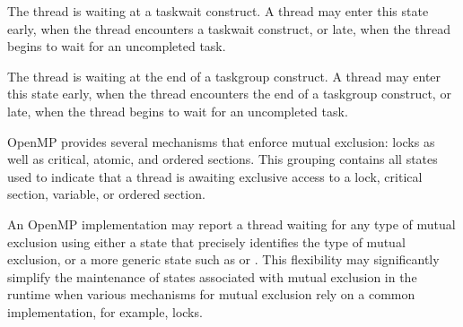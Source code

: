 
\begin{description}

\item {}

  The thread is waiting at a taskwait construct. A
  thread may enter this state early, when the
  thread encounters a taskwait construct, or late, when the thread
  begins to wait for an uncompleted task.

\item {}

  The thread is waiting at the end of a taskgroup construct. A
  thread may enter this state early, when the
  thread encounters the end of a taskgroup construct, or late, when the thread
  begins to wait for an uncompleted task.

\end{description}



OpenMP provides several mechanisms that enforce mutual exclusion:
locks as well as critical, atomic, and ordered sections.  This
grouping contains all states used to indicate that a thread is
awaiting exclusive access to a lock, critical section, variable,
or ordered section.

An OpenMP implementation may report a thread waiting for any type
of mutual exclusion using either a state that precisely identifies
the type of mutual exclusion, or  a more generic state such as
 or .  This
flexibility may significantly simplify the maintenance of states
associated with mutual exclusion in the runtime when various
mechanisms for mutual exclusion rely on a common implementation,
for example, locks.


